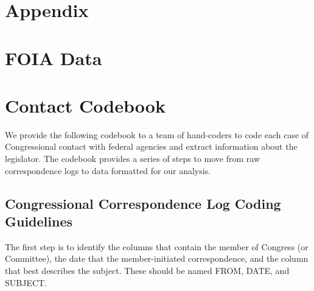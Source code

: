 \documentclass[12pt]{article}
\begin{document}
{%

\singlespacing




\clearpage
\appendix
\setcounter{table}{0}
\renewcommand{\thetable}{A\arabic{table}}

\section*{Appendix}


\section{FOIA Data}
%

%





\section{Contact Codebook} \label{a:codebook}
\singlespacing

We provide the following codebook to a team of hand-coders to code each case of Congressional contact with federal agencies and extract information about the legislator. The codebook provides a series of steps to move from raw correspondence logs to data formatted for our analysis.  

\subsection{Congressional Correspondence Log Coding Guidelines}

The first step is to identify the columns that contain the member of Congress (or Committee), the date that the member-initiated correspondence, and the column that best describes the subject. These should be named FROM, DATE, and SUBJECT. 

}
\end{document}
